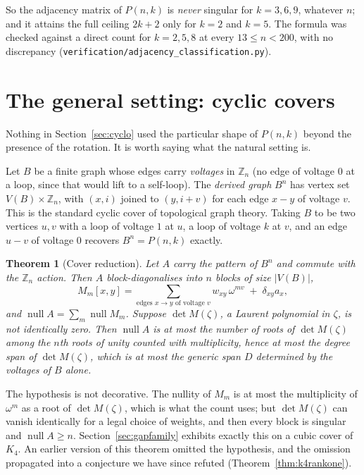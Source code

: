 \documentclass[11pt]{article}
\newtheorem{theorem}{Theorem}
\theoremstyle{definition}
\begin{document}
\noindent
So the adjacency matrix of $P(n,k)$ is \emph{never} singular for $k=3,6,9$,
whatever $n$; and it attains the full ceiling $2k+2$ only for $k=2$ and $k=5$.
The formula was checked against a direct count for $k=2,5,8$ at every
$13\le n<200$, with no discrepancy
(\texttt{verification/adjacency\_classification.py}).

\section{The general setting: cyclic covers}\label{sec:covers}
Nothing in Section~\ref{sec:cyclo} used the particular shape of $P(n,k)$ beyond
the presence of the rotation. It is worth saying what the natural setting is.

Let $B$ be a finite graph whose edges carry \emph{voltages} in $\mathbb Z_n$
(no edge of voltage $0$ at a loop, since that would lift to a self-loop). The
\emph{derived graph} $B^n$ has vertex set $V(B)\times\mathbb Z_n$, with
$(x,i)$ joined to $(y,i+v)$ for each edge $x\!-\!y$ of voltage $v$. This is the
standard cyclic cover of topological graph theory. Taking $B$ to be two
vertices $u,v$ with a loop of voltage $1$ at $u$, a loop of voltage $k$ at $v$,
and an edge $u\!-\!v$ of voltage $0$ recovers $B^n=P(n,k)$ exactly.

\begin{theorem}[Cover reduction]\label{thm:cover}
Let $A$ carry the pattern of $B^n$ and commute with the $\mathbb Z_n$ action.
Then $A$ block-diagonalises into $n$ blocks of size $|V(B)|$,
\[
  M_m[x,y]=\sum_{\text{edges }x\to y\text{ of voltage }v} w_{xy}\,\omega^{mv}
  \;+\;\delta_{xy}a_x ,
\]
and $\operatorname{null}A=\sum_{m}\operatorname{null}M_m$. Suppose
$\det M(\zeta)$, a Laurent polynomial in $\zeta$, is not identically zero. Then
$\operatorname{null}A$ is at most the number of roots of $\det M(\zeta)$ among
the $n$th roots of unity counted with multiplicity, hence at most the degree
span of $\det M(\zeta)$, which is at most the \emph{generic} span $D$
determined by the voltages of $B$ alone.
\end{theorem}

\noindent
The hypothesis is not decorative. The nullity of $M_m$ is at most the
multiplicity of $\omega^m$ as a root of $\det M(\zeta)$, which is what the count
uses; but $\det M(\zeta)$ can vanish identically for a legal choice of weights,
and then every block is singular and $\operatorname{null}A\ge n$.
Section~\ref{sec:gapfamily} exhibits exactly this on a cubic cover of $K_4$. An
earlier version of this theorem omitted the hypothesis, and the omission
propagated into a conjecture we have since refuted
(Theorem~\ref{thm:k4rankone}).
\end{document}
